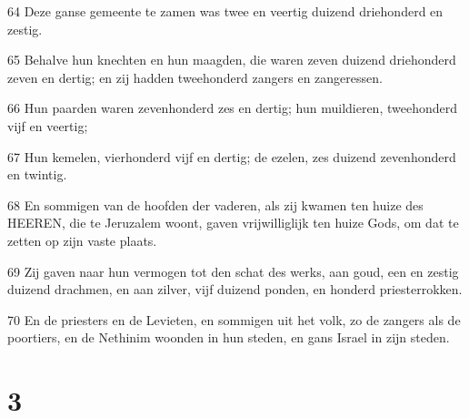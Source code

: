 \par 64 Deze ganse gemeente te zamen was twee en veertig duizend driehonderd en zestig.
\par 65 Behalve hun knechten en hun maagden, die waren zeven duizend driehonderd zeven en dertig; en zij hadden tweehonderd zangers en zangeressen.
\par 66 Hun paarden waren zevenhonderd zes en dertig; hun muildieren, tweehonderd vijf en veertig;
\par 67 Hun kemelen, vierhonderd vijf en dertig; de ezelen, zes duizend zevenhonderd en twintig.
\par 68 En sommigen van de hoofden der vaderen, als zij kwamen ten huize des HEEREN, die te Jeruzalem woont, gaven vrijwilliglijk ten huize Gods, om dat te zetten op zijn vaste plaats.
\par 69 Zij gaven naar hun vermogen tot den schat des werks, aan goud, een en zestig duizend drachmen, en aan zilver, vijf duizend ponden, en honderd priesterrokken.
\par 70 En de priesters en de Levieten, en sommigen uit het volk, zo de zangers als de poortiers, en de Nethinim woonden in hun steden, en gans Israel in zijn steden.

\chapter{3}

